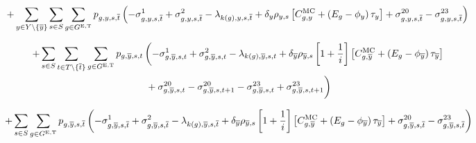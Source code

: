\documentclass{article}
\begin{document}
\begin{equation}
	+ \sum\limits_{\iYear \in \sYears 
		\setminus \{\iYearTerminal\}
	}\sum\limits_{\iScenario \in \sScenarios} \sum\limits_{\iGenerator \in \sGeneratorsExistingThermal} \vPower[\iGenerator,\iYear,\iScenario,\iIntervalTerminal] \left(-\dMinPowerOutput[\iGenerator,\iYear,\iScenario,\iIntervalTerminal] + \dMaxPowerOutputExistingThermal[\iGenerator,\iYear,\iScenario,\iIntervalTerminal] 
	- \dPowerBalance[k(\iGenerator),\iYear,\iScenario,\iIntervalTerminal] + \cDiscountRate \cScenarioDuration \left[\cMarginalCost + \left(\cEmissionsIntensity - \vBaseline\right)\vPermitPrice \right] + \dRampRateUp[\iGenerator,\iYear,\iScenario,\iIntervalTerminal] - \dRampRateDown[\iGenerator,\iYear,\iScenario,\iIntervalTerminal] \right)\\
\end{equation}

\begin{align}
	+ \sum\limits_{\iScenario \in \sScenarios} \sum\limits_{\iInterval \in \sIntervals \setminus \{\iIntervalTerminal\}} \sum\limits_{\iGenerator \in \sGeneratorsExistingThermal} \vPower[\iGenerator,\iYearTerminal,\iScenario,\iInterval] & \left(-\dMinPowerOutput[\iGenerator,\iYearTerminal,\iScenario,\iInterval] + \dMaxPowerOutputExistingThermal[\iGenerator,\iYearTerminal,\iScenario,\iInterval] - \dPowerBalance[k(\iGenerator),\iYearTerminal,\iScenario,\iInterval] + \cDiscountRate[\iYearTerminal] \cScenarioDuration[\iYearTerminal,\iScenario] \left[1 + \frac{1}{\cInterestRate}\right] \left[\cMarginalCost[\iGenerator,\iYearTerminal] + \left(\cEmissionsIntensity - \vBaseline[\iYearTerminal]\right)\vPermitPrice[\iYearTerminal] \right] \right.\nonumber\\
	& \left. \vphantom{1 + \frac{1}{\cInterestRate}} + \dRampRateUp[\iGenerator,\iYearTerminal,\iScenario,\iInterval] - \dRampRateUp[\iGenerator,\iYearTerminal,\iScenario,\iInterval + 1] - \dRampRateDown[\iGenerator,\iYearTerminal,\iScenario,\iInterval] + \dRampRateDown[\iGenerator,\iYearTerminal,\iScenario,\iInterval + 1]
	\right)\nonumber\\
\end{align}

\begin{equation}
	+ \sum\limits_{\iScenario \in \sScenarios} \sum\limits_{\iGenerator \in \sGeneratorsExistingThermal} \vPower[\iGenerator,\iYearTerminal,\iScenario,\iIntervalTerminal] \left(-\dMinPowerOutput[\iGenerator,\iYearTerminal,\iScenario,\iIntervalTerminal] + \dMaxPowerOutputExistingThermal[\iGenerator,\iYearTerminal,\iScenario,\iIntervalTerminal] - \dPowerBalance[k(\iGenerator),\iYearTerminal,\iScenario,\iIntervalTerminal] + \cDiscountRate[\iYearTerminal] \cScenarioDuration[\iYearTerminal,\iScenario] \left[1 + \frac{1}{\cInterestRate}\right] \left[\cMarginalCost[\iGenerator,\iYearTerminal] + \left(\cEmissionsIntensity - \vBaseline[\iYearTerminal]\right)\vPermitPrice[\iYearTerminal] \right] + \dRampRateUp[\iGenerator,\iYearTerminal,\iScenario,\iIntervalTerminal] - \dRampRateDown[\iGenerator,\iYearTerminal,\iScenario,\iIntervalTerminal] \right)
\end{equation}
\end{document}

